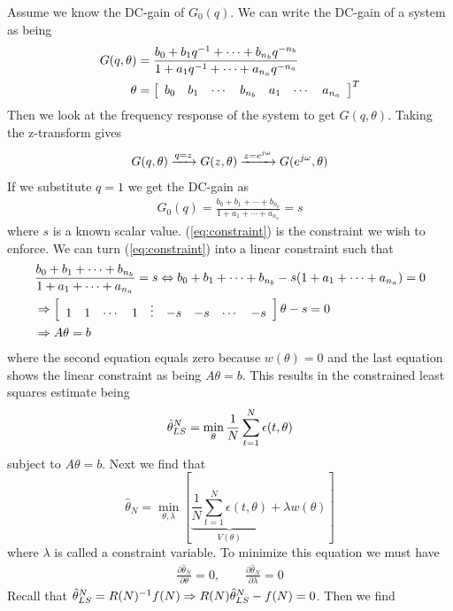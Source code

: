 \begin{example}
Assume we know the DC-gain of $G_0(q)$. We can write the DC-gain of a system as being
\begin{align*}
G(q,\theta) &= \frac{b_0+b_1q^{-1}+\cdots+b_{n_b}q^{-n_b}}{1+a_1q^{-1}+\cdots+a_{n_a}q^{-n_a}} \\
\theta &= \left[\begin{array}{c c c c c c c} b_0 & b_1 & \cdots & b_{n_b} & a_1 & \cdots & a_{n_a} \end{array}\right]^T \\
\end{align*}
Then we look at the frequency response of the system to get $G(q,\theta)$. Taking the z-transform gives
$$G(q,\theta) \xrightarrow{q=z} G(z,\theta) \xrightarrow{z=e^{j\omega}} G(e^{j\omega},\theta)$$
If we substitute $q=1$ we get the DC-gain as
\begin{align}
\label{eq:constraint}
G_0(q) = \frac{b_0+b_1+\cdots+b_{n_b}}{1+a_1+\cdots+a_{n_a}} = s
\end{align}
where $s$ is a known scalar value. (\ref{eq:constraint}) is the constraint we wish to enforce. We can turn (\ref{eq:constraint}) into a linear constraint such that
\begin{align*}
&\frac{b_0+b_1+\cdots+b_{n_b}}{1+a_1+\cdots+a_{n_a}} = s \Leftrightarrow b_0+b_1+\cdots+b_{n_b} - s(1+a_1+\cdots+a_{n_a}) = 0 \\
&\Rightarrow \left[\begin{array}{c c c c c c c c c} 1 & 1 & \cdots & 1 & \vdots & -s & -s & \cdots & -s \end{array}\right]\theta-s=0 \\
&\Rightarrow A\theta = b
\end{align*}
where the second equation equals zero because $w(\theta)=0$ and the last equation shows the linear constraint as being $A\theta=b$. This results in the constrained least squares estimate being
$$\hat{\theta}_{LS}^N = \min_\theta\frac{1}{N}\sum_{t=1}^N\epsilon(t,\theta)$$
subject to $A\theta=b$. Next we find that
$$\hat{\theta}_N = \min_{\theta,\lambda}\left[\underbrace{\frac{1}{N}\sum_{t=1}^N\epsilon(t,\theta)}_{V(\theta)} +\lambda w(\theta)\right]$$
where $\lambda$ is called a constraint variable. To minimize this equation we must have
\begin{align*}
\frac{\partial\hat{\theta}_N}{\partial\theta}=0, \qquad \frac{\partial\hat{\theta}_N}{\partial\lambda}=0
\end{align*}
Recall that $\hat{\theta}_{LS}^N=R(N)^{-1}f(N)\Rightarrow R(N)\hat{\theta}_{LS}^N-f(N)=0$. Then we find
\begin{align*}

\end{align*}
\end{example}
